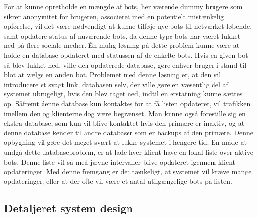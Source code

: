 For at kunne opretholde en mængde af bots, her værende dummy brugere som sikrer anonymitet for brugeren, associeret med en potentielt mistænkelig opførelse, vil det være nødvendigt at kunne tilføje nye bots til netværket løbende, samt opdatere status af nuværende bots, da denne type bots har været lukket ned på flere sociale medier. Én mulig løsning på dette problem kunne være at holde en database opdateret med statussen af de enkelte bots. Hvis en given bot så blev lukket ned, ville den opdaterede database, gøre enhver bruger i stand til blot at vælge en anden bot. Problemet med denne løsning er, at den vil introducere et svagt link, databasen selv, der ville gøre en væsentlig del af systemet ubrugeligt, hvis den blev taget ned, indtil en erstatning kunne sættes op. Såfremt denne database kun kontaktes for at få listen opdateret, vil trafikken imellem den og klienterne dog være begrænset. Man kunne også forestille sig en ekstra database, som kun vil blive kontaktet hvis den primære er inaktiv, og at denne database kender til andre databaser som er backups af den primære. Denne opbygning vil gøre det meget svært at lukke systemet i længere tid.
En måde at undgå dette databaseproblem, er at lade hver klient have en lokal liste over aktive bots. Denne liste vil så med jævne intervaller blive opdateret igennem klient opdateringer. Med denne fremgang er det tænkeligt, at systemet vil kræve mange opdateringer, eller at der ofte vil være et antal utilgængelige bots på listen. 






\subsection{Detaljeret system design} %

